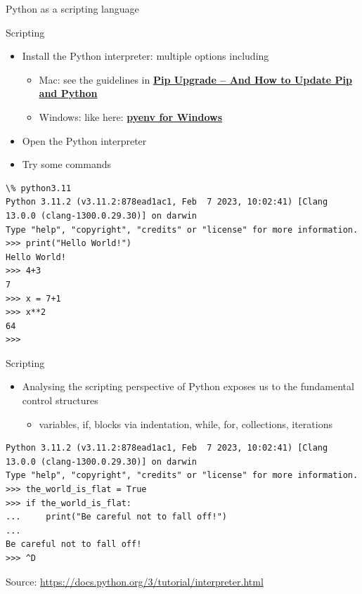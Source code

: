 \documentclass{beamer}
\begin{document}
\begin{frame}
{\centerline{Python as a scripting language}}
\end{frame}





\begin{frame}[fragile]
{\centerline{Scripting}}
\begin{itemize}
    \item Install the Python interpreter: multiple options including
    \begin{itemize}
    	\item Mac: see the guidelines in \href{https://www.freecodecamp.org/news/pip-upgrade-and-how-to-update-pip-and-python/}{\bf Pip Upgrade – And How to Update Pip and Python}
	\item Windows: like here: \href{https://pypi.org/project/pyenv-win/}{\bf pyenv for Windows}
    \end{itemize}
    \item Open the Python interpreter
    \item Try some commands
\end{itemize} 
\begin{lstlisting}[style=myPythonStyle]
\% python3.11
Python 3.11.2 (v3.11.2:878ead1ac1, Feb  7 2023, 10:02:41) [Clang 13.0.0 (clang-1300.0.29.30)] on darwin
Type "help", "copyright", "credits" or "license" for more information.
>>> print("Hello World!")
Hello World!
>>> 4+3
7
>>> x = 7+1
>>> x**2
64
>>> 
\end{lstlisting}

\end{frame}

\begin{frame}[fragile]
{\centerline{Scripting}}
\begin{itemize}
    \item Analysing the scripting perspective of Python exposes us to the fundamental control structures
    \begin{itemize}
    \item variables, if, blocks via indentation, while, for, collections, iterations
    \end{itemize} 
\end{itemize} 
\begin{lstlisting}[style=myPythonStyle]
% python3.11
Python 3.11.2 (v3.11.2:878ead1ac1, Feb  7 2023, 10:02:41) [Clang 13.0.0 (clang-1300.0.29.30)] on darwin
Type "help", "copyright", "credits" or "license" for more information.
>>> the_world_is_flat = True
>>> if the_world_is_flat:
...     print("Be careful not to fall off!")
... 
Be careful not to fall off!
>>> ^D
\end{lstlisting}
\begin{center}
\tiny Source: \url{https://docs.python.org/3/tutorial/interpreter.html}
\end{center}

\end{frame}
\end{document}
